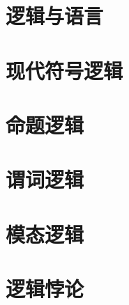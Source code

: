 \chapter{逻辑与语言}










\chapter{现代符号逻辑}









\chapter{命题逻辑}





\chapter{谓词逻辑}







\chapter{模态逻辑}




\chapter{逻辑悖论}




